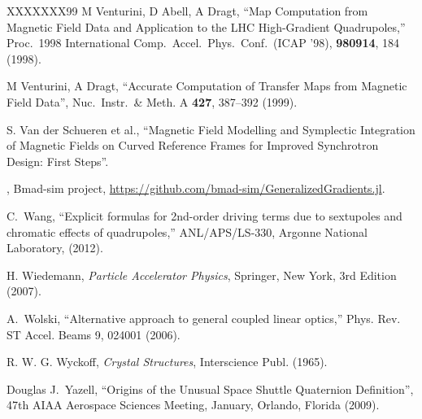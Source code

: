 \begin{thebibliography}{XXXXXXX99}
M Venturini, D Abell, A Dragt, 
``Map Computation from Magnetic Field Data and Application to the LHC
High-Gradient Quadrupoles,'' 
Proc.\ 1998 International Comp.\ Accel.\ Phys.\ Conf.\ (ICAP '98),
{\bf 980914}, 184 (1998).

M Venturini, A Dragt,
``Accurate Computation of Transfer Maps from Magnetic Field Data'',
Nuc.\ Instr.\ \& Meth. A {\bf 427}, 387--392 (1999).

S. Van der Schueren et al.,
``Magnetic Field Modelling and Symplectic Integration of Magnetic Fields on Curved Reference Frames
for Improved Synchrotron Design: First Steps''.

, Bmad-sim project,
\url{https://github.com/bmad-sim/GeneralizedGradients.jl}.

C.~Wang,
``Explicit formulas for 2nd-order driving terms due to sextupoles and
chromatic effects of quadrupoles,''
ANL/APS/LS-330, Argonne National Laboratory, (2012).

H. Wiedemann, {\em Particle Accelerator Physics}, Springer, New York, 3rd Edition (2007). 

A.~Wolski,  ``Alternative approach to general coupled linear optics,''
Phys. Rev. ST Accel. Beams 9, 024001 (2006).

R. W. G. Wyckoff, {\em Crystal Structures}, Interscience Publ. (1965).

Douglas J.~Yazell,
``Origins of the Unusual Space Shuttle Quaternion Definition'',
47th AIAA Aerospace Sciences Meeting, January, Orlando, Florida (2009).

\end{thebibliography}
